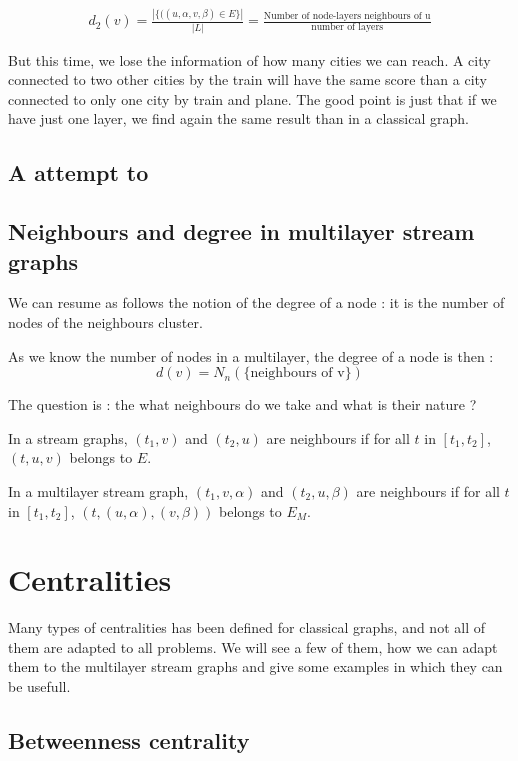 \documentclass[dvipsnames,a4paper,11pt]{article}
\theoremstyle{definition}
\theoremstyle{remark}
\theoremstyle{remark}
\begin{document}
		\begin{align}
			d_2(v)= \frac{|\{((u,\alpha,v,\beta) \in E\}|}{|L|} = \frac{\text{Number of node-layers neighbours of u}}{\text{number of layers}}
		\end{align}
		
		But this time, we lose the information of how many cities we can reach. A city connected to two other cities by the train will have the same score than a city connected to only one city by train and plane. The good point is just that if we have just one layer, we find again the same result than in a classical graph.
		
		\subsection{A attempt to }
		
		\subsection{Neighbours and degree in multilayer stream graphs}
		
		We can resume as follows the notion of the degree of a node : it is the number of nodes of the neighbours cluster. 
		
		As we know the number of nodes in a multilayer, the degree of a node is then : 
		$$
			d(v) = N_n(\{\text{neighbours of v}\})
		$$
		
		The question is : the what neighbours do we take and what is their nature ?
		
		In a stream graphs, $(t_1,v)$ and $(t_2,u)$ are neighbours if for all $t$ in $[t_1,t_2]$, $(t,u,v)$ belongs to $E$.
		
		In a multilayer stream graph, $(t_1,v,\alpha)$ and $(t_2,u,\beta)$ are neighbours if for all $t$ in $[t_1,t_2]$, $(t,(u,\alpha),(v,\beta))$ belongs to $E_M$.
		
	\section{Centralities}
		
		Many types of centralities has been defined for classical graphs, and not all of them are adapted to all problems. We will see a few of them, how we can adapt them to the multilayer stream graphs and give some examples in which they can be usefull.
	
		\subsection{Betweenness centrality}
		
\end{document}
